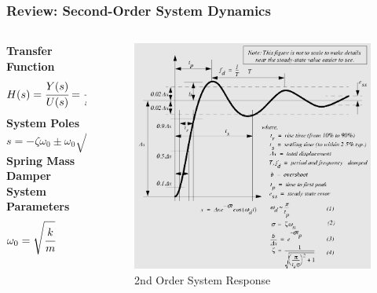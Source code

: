\documentclass[aspectratio=169]{beamer}
\begin{document}
\begin{frame}
	\frametitle{Review: Second-Order System Dynamics}
	\begin{columns}
		\begin{column}{0.5\textwidth}
			\textbf{Transfer Function}
			\[
				H(s) 
				= \cfrac{Y(s)}{U(s)} 
				= \cfrac{
					\omega_0^2
				}{
					s^2 + 2 \zeta \omega_0 s + \omega_0^2
				}
			\]
			\textbf{System Poles}
			\[
				s = - \zeta \omega_0 \pm \omega_0 \sqrt{1 - \zeta^2}
			\]
			\textbf{Spring Mass Damper System Parameters}
			\[
				\omega_0 = \sqrt{\cfrac{k}{m}}
				\hspace{0.5 in}
				\zeta = \sqrt{\cfrac{c^2}{4 m k}}
			\]
		\end{column}
		\begin{column}{0.375\textwidth}
			\begin{figure}[]
				\includegraphics[width=\textwidth]{Images/2ndOrderTransient.png}
				2nd Order System Response \cite{engineerOnADisk_2ndOrderDynamics}
			\end{figure}
		\end{column}
	\end{columns}
\end{frame}
\end{document}
